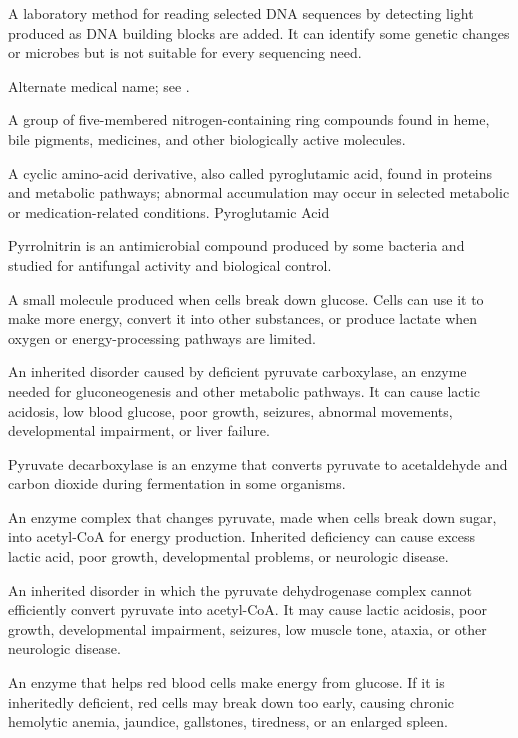  A laboratory method for reading selected DNA sequences by detecting light produced as DNA building blocks are added. It can identify some genetic changes or microbes but is not suitable for every sequencing need.

 Alternate medical name; see .

 A group of five-membered nitrogen-containing ring compounds found in heme, bile pigments, medicines, and other biologically active molecules.

 A cyclic amino-acid derivative, also called pyroglutamic acid, found in proteins and metabolic pathways; abnormal accumulation may occur in selected metabolic or medication-related conditions.
\synonyms
Pyroglutamic Acid

 Pyrrolnitrin is an antimicrobial compound produced by some bacteria and studied for antifungal activity and biological control.

 A small molecule produced when cells break down glucose. Cells can use it to make more energy, convert it into other substances, or produce lactate when oxygen or energy-processing pathways are limited.

 An inherited disorder caused by deficient pyruvate carboxylase, an enzyme needed for gluconeogenesis and other metabolic pathways. It can cause lactic acidosis, low blood glucose, poor growth, seizures, abnormal movements, developmental impairment, or liver failure.

 Pyruvate decarboxylase is an enzyme that converts pyruvate to acetaldehyde and carbon dioxide during fermentation in some organisms.

 An enzyme complex that changes pyruvate, made when cells break down sugar, into acetyl-CoA for energy production. Inherited deficiency can cause excess lactic acid, poor growth, developmental problems, or neurologic disease.

 An inherited disorder in which the pyruvate dehydrogenase complex cannot efficiently convert pyruvate into acetyl-CoA. It may cause lactic acidosis, poor growth, developmental impairment, seizures, low muscle tone, ataxia, or other neurologic disease.

 An enzyme that helps red blood cells make energy from glucose. If it is inheritedly deficient, red cells may break down too early, causing chronic hemolytic anemia, jaundice, gallstones, tiredness, or an enlarged spleen.

